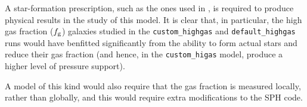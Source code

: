 A star-formation prescription, such as the ones used in \citet{many}, is required to produce physical results in the study of this model.
It is clear that, in particular, the high gas fraction ($f_\mathrm{g}$) galaxies studied in the {\tt custom_highgas} and {\tt default_highgas} runs would have benfitted significantly from the ability to form actual stars and reduce their gas fraction (and hence, in the {\tt custom_higas} model, produce a higher level of pressure support).

A model of this kind would also require that the gas fraction is measured locally, rather than globally, and this would require extra modifications to the SPH code.
